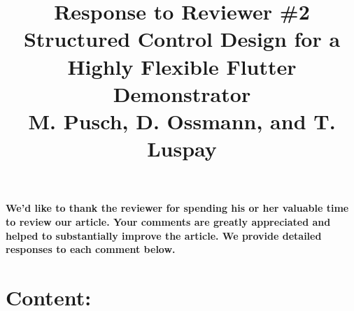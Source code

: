\documentclass{article}
\begin{document}
\title{\textsf{Response to Reviewer \#2 } \\ [+2mm]  \small{Structured Control Design for a Highly Flexible Flutter Demonstrator}
\\ [+2mm]
M. Pusch, D. Ossmann, and T. Luspay}

\date{}
\maketitle

\textbf{We'd like to  thank the reviewer for spending his or her valuable time to review our article. Your comments are greatly appreciated and helped to substantially improve the article. We provide detailed responses to each comment below.}



\section{Content:}
\end{document}
